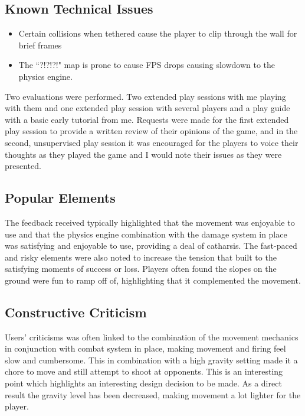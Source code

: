 \documentclass[10pt,a4paper]{article}
\begin{document}
\subsection{Known Technical Issues}

\begin{itemize}
\item Certain collisions when tethered cause the player to clip through the wall for brief frames
\item The ``?!?!?!" map is prone to cause FPS drops causing slowdown to the physics engine.
\end{itemize}

Two evaluations were performed. Two extended play sessions with me playing with them and one extended play session with several players and a play guide with a basic early tutorial from me. Requests were made for the first extended play session to provide a written review of their opinions of the game, and in the second, unsupervised play session it was encouraged for the players to voice their thoughts as they played the game and I would note their issues as they were presented.

\subsection{Popular Elements}

The feedback received typically highlighted that the movement was enjoyable to use and that the physics engine combination with the damage system in place was satisfying and enjoyable to use, providing a deal of catharsis. The fast-paced and risky elements were also noted to increase the tension that built to the satisfying moments of success or loss. Players often found the slopes on the ground were fun to ramp off of, highlighting that it complemented the movement.

\subsection{Constructive Criticism}

Users' criticisms was often linked to the combination of the movement mechanics in conjunction with combat system in place, making movement and firing feel slow and cumbersome. This in combination with a high gravity setting made it a chore to move and still attempt to shoot at opponents. This is an interesting point which highlights an interesting design decision to be made. As a direct result the gravity level has been decreased, making movement a lot lighter for the player.
\end{document}
